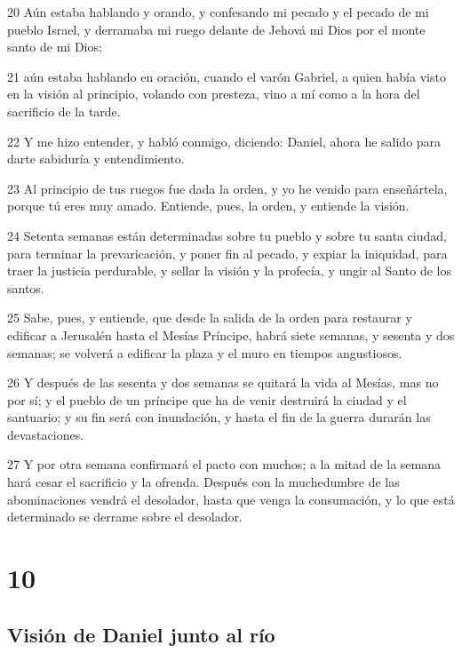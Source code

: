\par 20 Aún estaba hablando y orando, y confesando mi pecado y el pecado de mi pueblo Israel, y derramaba mi ruego delante de Jehová mi Dios por el monte santo de mi Dios;
\par 21 aún estaba hablando en oración, cuando el varón Gabriel, a quien había visto en la visión al principio, volando con presteza, vino a mí como a la hora del sacrificio de la tarde.
\par 22 Y me hizo entender, y habló conmigo, diciendo: Daniel, ahora he salido para darte sabiduría y entendimiento. 
\par 23 Al principio de tus ruegos fue dada la orden, y yo he venido para enseñártela, porque tú eres muy amado. Entiende, pues, la orden, y entiende la visión.
\par 24 Setenta semanas están determinadas sobre tu pueblo y sobre tu santa ciudad, para terminar la prevaricación, y poner fin al pecado, y expiar la iniquidad, para traer la justicia perdurable, y sellar la visión y la profecía, y ungir al Santo de los santos.
\par 25 Sabe, pues, y entiende, que desde la salida de la orden para restaurar y edificar a Jerusalén hasta el Mesías Príncipe, habrá siete semanas, y sesenta y dos semanas; se volverá a edificar la plaza y el muro en tiempos angustiosos.
\par 26 Y después de las sesenta y dos semanas se quitará la vida al Mesías, mas no por sí; y el pueblo de un príncipe que ha de venir destruirá la ciudad y el santuario; y su fin será con inundación, y hasta el fin de la guerra durarán las devastaciones.
\par 27 Y por otra semana confirmará el pacto con muchos; a la mitad de la semana hará cesar el sacrificio y la ofrenda. Después con la muchedumbre de las abominaciones vendrá el desolador, hasta que venga la consumación, y lo que está determinado se derrame sobre el desolador.

\chapter{10}

\section*{Visión de Daniel junto al río}

